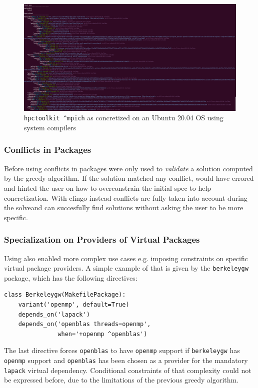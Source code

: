 \begin{figure}[h]
\includegraphics[width=\columnwidth]{figures/hpctoolkit_concretized.png}
\caption{\texttt{hpctoolkit \^{}mpich} as concretized on an Ubuntu 20.04 OS using system compilers}
\label{fig:hpctoolkit}
\end{figure}

\subsubsection{Conflicts in Packages}
Before using \clingo{} conflicts in packages were only used to \emph{validate} a solution computed by the greedy-algorithm. If the solution matched any conflict, \spack{} would have errored and hinted the user on how to overconstrain the initial spec to help concretization. With clingo instead conflicts are fully taken into account during the solve\footnotemark and \spack{} can succesfully find solutions without asking the user to be more specific.

\subsubsection{Specialization on Providers of Virtual Packages}
Using \clingo{} also enabled more complex use cases e.g. imposing constraints on specific virtual package providers. A simple example of that is given by the \texttt{berkeleygw} package, which has the following directives:
\begin{verbatim}
class Berkeleygw(MakefilePackage):
    variant('openmp', default=True)
    depends_on('lapack')
    depends_on('openblas threads=openmp', 
               when='+openmp ^openblas')
\end{verbatim}
The last directive forces \texttt{openblas} to have \texttt{openmp} support if \texttt{berkeleygw} has \texttt{openmp} support and \texttt{openblas} has been chosen as a provider for the mandatory \texttt{lapack} virtual dependency. Conditional constraints of that complexity could not be expressed before, due to the limitations of the previous greedy algorithm.
